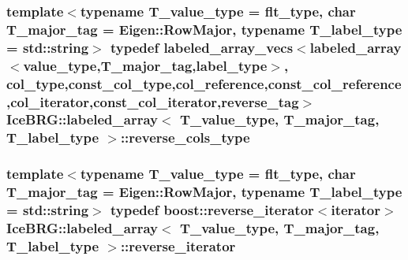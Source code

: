 \subsubsection[{reverse\+\_\+cols\+\_\+type}]{\setlength{\rightskip}{0pt plus 5cm}template$<$typename T\+\_\+value\+\_\+type = flt\+\_\+type, char T\+\_\+major\+\_\+tag = Eigen\+::\+Row\+Major, typename T\+\_\+label\+\_\+type = std\+::string$>$ typedef {\bf labeled\+\_\+array\+\_\+vecs}$<${\bf labeled\+\_\+array}$<${\bf value\+\_\+type},T\+\_\+major\+\_\+tag,{\bf label\+\_\+type}$>$, {\bf col\+\_\+type},{\bf const\+\_\+col\+\_\+type},{\bf col\+\_\+reference},{\bf const\+\_\+col\+\_\+reference},{\bf col\+\_\+iterator},{\bf const\+\_\+col\+\_\+iterator},{\bf reverse\+\_\+tag}$>$ {\bf Ice\+B\+R\+G\+::labeled\+\_\+array}$<$ T\+\_\+value\+\_\+type, T\+\_\+major\+\_\+tag, T\+\_\+label\+\_\+type $>$\+::{\bf reverse\+\_\+cols\+\_\+type}}\label{classIceBRG_1_1labeled__array_ae1a285122696e956d2bf21b147f94f9d}
\hypertarget{classIceBRG_1_1labeled__array_a5125d18747cdbb29f32a4a46c97d348e}{}
\subsubsection[{reverse\+\_\+iterator}]{\setlength{\rightskip}{0pt plus 5cm}template$<$typename T\+\_\+value\+\_\+type = flt\+\_\+type, char T\+\_\+major\+\_\+tag = Eigen\+::\+Row\+Major, typename T\+\_\+label\+\_\+type = std\+::string$>$ typedef boost\+::reverse\+\_\+iterator$<${\bf iterator}$>$ {\bf Ice\+B\+R\+G\+::labeled\+\_\+array}$<$ T\+\_\+value\+\_\+type, T\+\_\+major\+\_\+tag, T\+\_\+label\+\_\+type $>$\+::{\bf reverse\+\_\+iterator}}\label{classIceBRG_1_1labeled__array_a5125d18747cdbb29f32a4a46c97d348e}
\hypertarget{classIceBRG_1_1labeled__array_a5c4132b2acc103385909ec165cd1a040}{}
